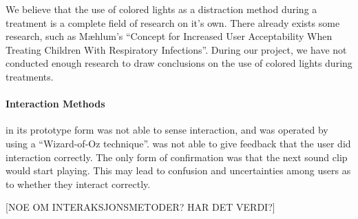 We believe that the use of colored lights as a distraction method during a treatment is a complete field of research on it's own. There already exists some research, such as M\ae hlum's ``Concept for Increased User Acceptability When Treating Children With Respiratory Infections\cite{mahlum2013}''. During our project, we have not conducted enough research to draw conclusions on the use of colored lights during treatments. 


\paragraph{Interaction Methods}
\buddy{} in its prototype form was not able to sense interaction, and was operated by using a ``Wizard-of-Oz technique''\cite{wilson1988rapid}. \buddy{} was not able to give feedback that the user did interaction correctly. The only form of confirmation was that the next sound clip would start playing. This may lead to confusion and uncertainties among users as to whether they interact correctly. \iref{}

[NOE OM INTERAKSJONSMETODER? HAR DET VERDI?]




